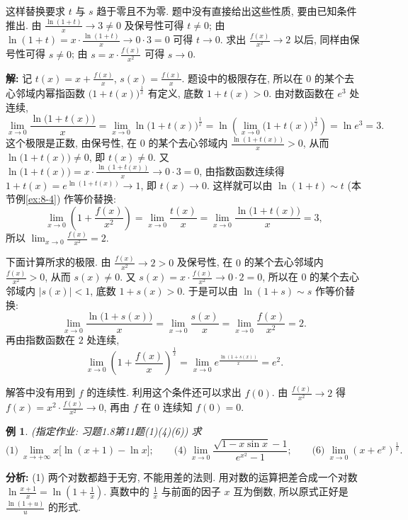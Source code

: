 \documentclass[UTF8,openany]{ctexbook}
\theoremstyle{chinesetextbook}
\newtheorem{example}{例}[section]
\newenvironment{cnsolution}{\par\indent\textbf{解:} \ignorespaces}{\par}
\begin{document}
这样替换要求 $t$ 与 $s$ 趋于零且不为零. 题中没有直接给出这些性质, 要由已知条件推出. 由 $\displaystyle\frac{\ln(1+t)}x\to3\ne0$ 及保号性可得 $t\ne0$; 由 $\displaystyle\ln(1+t)=x\cdot\frac{\ln(1+t)}x\to0\cdot3=0$ 可得 $t\to0$. 求出 $\displaystyle\frac{f(x)}{x^2}\to2$ 以后, 同样由保号性可得 $s\ne0$; 由 $\displaystyle s=x\cdot\frac{f(x)}{x^2}$ 可得 $s\to0$.
\begin{cnsolution}
记 $\displaystyle t(x)=x+\frac{f(x)}x$, $\displaystyle s(x)=\frac{f(x)}x$. 题设中的极限存在, 所以在 $0$ 的某个去心邻域内幂指函数 $\bigl(1+t(x)\bigr)^{\frac1x}$ 有定义, 底数 $1+t(x)>0$. 由对数函数在 $e^3$ 处连续,
\[
\lim_{x\to0}\frac{\ln\bigl(1+t(x)\bigr)}x=\lim_{x\to0}\ln\bigl(1+t(x)\bigr)^{\frac1x}=\ln\left(\lim_{x\to0}\bigl(1+t(x)\bigr)^{\frac1x}\right)=\ln e^3=3.
\]
这个极限是正数, 由保号性, 在 $0$ 的某个去心邻域内 $\displaystyle\frac{\ln(1+t(x))}x>0$, 从而 $\ln\bigl(1+t(x)\bigr)\ne0$, 即 $t(x)\ne0$. 又 $\displaystyle\ln\bigl(1+t(x)\bigr)=x\cdot\frac{\ln(1+t(x))}x\to0\cdot3=0$, 由指数函数连续得 $1+t(x)=e^{\ln(1+t(x))}\to1$, 即 $t(x)\to0$. 这样就可以由 $\ln(1+t)\sim t$ (本节例\ref{ex:8-4}) 作等价替换:
\[
\lim_{x\to0}\left(1+\frac{f(x)}{x^2}\right)=\lim_{x\to0}\frac{t(x)}x=\lim_{x\to0}\frac{\ln\bigl(1+t(x)\bigr)}x=3,
\]
所以 $\displaystyle\lim_{x\to0}\frac{f(x)}{x^2}=2$.

下面计算所求的极限. 由 $\displaystyle\frac{f(x)}{x^2}\to2>0$ 及保号性, 在 $0$ 的某个去心邻域内 $\displaystyle\frac{f(x)}{x^2}>0$, 从而 $s(x)\ne0$. 又 $\displaystyle s(x)=x\cdot\frac{f(x)}{x^2}\to0\cdot2=0$, 所以在 $0$ 的某个去心邻域内 $|s(x)|<1$, 底数 $1+s(x)>0$. 于是可以由 $\ln(1+s)\sim s$ 作等价替换:
\[
\lim_{x\to0}\frac{\ln\bigl(1+s(x)\bigr)}x=\lim_{x\to0}\frac{s(x)}x=\lim_{x\to0}\frac{f(x)}{x^2}=2.
\]
再由指数函数在 $2$ 处连续,
\[
\lim_{x\to0}\left(1+\frac{f(x)}x\right)^{\frac1x}=\lim_{x\to0}e^{\frac{\ln(1+s(x))}x}=e^2.
\]
\end{cnsolution}
解答中没有用到 $f$ 的连续性. 利用这个条件还可以求出 $f(0)$. 由 $\displaystyle\frac{f(x)}{x^2}\to2$ 得 $\displaystyle f(x)=x^2\cdot\frac{f(x)}{x^2}\to0$, 再由 $f$ 在 $0$ 连续知 $f(0)=0$.
\begin{example}
\textnormal{(指定作业: 习题1.8第11题(1)(4)(6))} 求
\[
\text{(1)}\ \lim_{x\to+\infty}x\bigl[\ln(x+1)-\ln x\bigr];\qquad\text{(4)}\ \lim_{x\to0}\frac{\sqrt{1-x\sin x}-1}{e^{x^2}-1};\qquad\text{(6)}\ \lim_{x\to0}\left(x+e^x\right)^{\frac1x}.
\]
\end{example}
\par\indent\textbf{分析:} (1) 两个对数都趋于无穷, 不能用差的法则. 用对数的运算把差合成一个对数 $\displaystyle\ln\frac{x+1}x=\ln\left(1+\frac1x\right)$. 真数中的 $\displaystyle\frac1x$ 与前面的因子 $x$ 互为倒数, 所以原式正好是 $\displaystyle\frac{\ln(1+u)}u$ 的形式.
\end{document}
